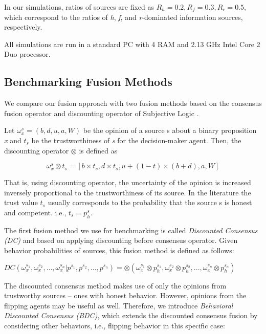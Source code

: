 \documentclass[a4,12pt]{ozu-thesis}
\begin{document}
In our simulations, ratios of sources are fixed as $R_{h} = 0.2, R_{f} = 0.3, R_{r} = 0.5 $, which correspond to the ratios of \textit{h}, \textit{f}, and \textit{r}-dominated information sources, respectively.

All simulations are run in a standard PC with 4 RAM and 2.13 GHz Intel Core 2 Duo processor.

\subsection{Benchmarking Fusion Methods}
We compare our fusion approach with two fusion methods based on the consensus fusion operator and discounting operator of Subjective Logic \cite{josang2011subjective}.


Let $\omega _{x}^{s} = \left ( b, d, u, a, W  \right )$ be the opinion of a source s about a binary proposition \textit{x} and $t_{s}$ be the trustworthiness of \textit{s} for the decision-maker agent. Then, the discounting operator $\otimes$ is defined as

\begin{equation}
\omega _{x}^{s}\otimes t_{s} = [b \times t_{s}, d\times t_{s}, u + (1-t)\times (b+d), a, W]
\end{equation}


That is, using discounting operator, the uncertainty of the opinion is increased inversely proportional to the trustworthiness of its source. In the literature the trust value $t_{s}$ usually corresponds to the probability that the source s is honest and
competent. i.e., $t_{s} = p_{h}^{s}$.


The first fusion method we use for benchmarking is called \textit{Discounted Consensus (DC)} and based on applying discounting before consensus operator. Given behavior probabilities of sources, this fusion method is defined as follows:

$
DC(\omega _{x}^{s_{1}}, \omega _{x}^{s_{2}},\ldots, \omega _{x}^{s_{n}}|p^{s_{1}}, p^{s_{2}},\ldots, p^{s_{n}}) = \otimes (\omega _{x}^{s_{1}}\otimes p_{h}^{s_{1}}, \omega _{x}^{s_{2}}\otimes p_{h}^{s_{2}}, ..., \omega _{x}^{s_{n}}\otimes p_{h}^{s_{n}})
$



The discounted consensus method makes use of only the opinions from trustworthy sources – ones with honest behavior. However, opinions from the flipping agents may be useful as well. Therefore, we introduce \textit{Behavioral Discounted Consensus (BDC)}, which extends the discounted consensus fusion by considering other behaviors, i.e., flipping behavior in this specific case:
\end{document}
